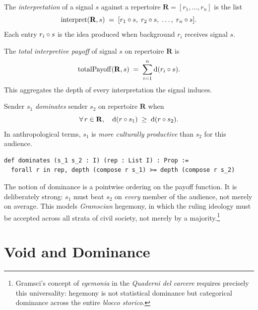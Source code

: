 \begin{definition}[Interpretation]
\label{def:interpret-ch11}
The \emph{interpretation} of a signal $s$ against a repertoire
$\mathbf{R} = [r_1, \dots, r_n]$ is the list
\[
  \operatorname{interpret}(\mathbf{R}, s)
  \;=\; [r_1 \circ s,\; r_2 \circ s,\; \dots,\; r_n \circ s].
\]
Each entry $r_i \circ s$ is the idea produced when background $r_i$
receives signal $s$.
\end{definition}

\begin{definition}
\label{def:total-payoff}
The \emph{total interpretive payoff} of signal $s$ on repertoire $\mathbf{R}$
is
\[
  \operatorname{totalPayoff}(\mathbf{R}, s)
  \;=\; \sum_{i=1}^{n} \operatorname{d}(r_i \circ s).
\]
This aggregates the depth of every interpretation the signal induces.
\end{definition}

\begin{definition}[Dominance]
\label{def:dominance}
Sender $s_1$ \emph{dominates} sender $s_2$ on repertoire $\mathbf{R}$ when
\[
  \forall\, r \in \mathbf{R},\quad
  \operatorname{d}(r \circ s_1) \;\ge\; \operatorname{d}(r \circ s_2).
\]
In anthropological terms, $s_1$ is \emph{more culturally productive} than
$s_2$ for this audience.
\end{definition}

\begin{lstlisting}[caption={Dominance in Lean~4}]
def dominates (s_1 s_2 : I) (rep : List I) : Prop :=
  forall r in rep, depth (compose r s_1) >= depth (compose r s_2)
\end{lstlisting}

The notion of dominance is a pointwise ordering on the payoff function.  It
is deliberately strong: $s_1$ must beat $s_2$ on \emph{every} member of the
audience, not merely on average.  This models \emph{Gramscian} hegemony, in
which the ruling ideology must be accepted across all strata of civil
society, not merely by a majority.\footnote{Gramsci's concept of
\emph{egemonia} in the \textit{Quaderni del carcere} requires precisely
this universality: hegemony is not statistical dominance but categorical
dominance across the entire \emph{blocco storico}.}

\section{Void and Dominance}
\label{sec:ch11-void}

